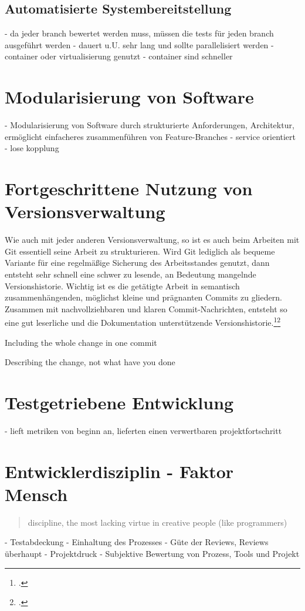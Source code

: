 \subsection{Automatisierte Systembereitstellung}
- da jeder branch bewertet werden muss, müssen die tests für jeden branch ausgeführt werden
- dauert u.U. sehr lang und sollte parallelisiert werden
- container oder virtualisierung genutzt 
- container sind schneller
\section{Modularisierung von Software}
- Modularisierung von Software durch strukturierte Anforderungen, Architektur, ermöglicht einfacheres zusammenführen von Feature-Branches
- service orientiert
- lose kopplung
\section{Fortgeschrittene Nutzung von Versionsverwaltung}
Wie auch mit jeder anderen Versionsverwaltung, so ist es auch beim Arbeiten mit Git essentiell seine Arbeit zu strukturieren. Wird Git lediglich als bequeme Variante für eine regelmäßige Sicherung des Arbeitsstandes genutzt, dann entsteht sehr schnell eine schwer zu lesende, an Bedeutung mangelnde Versionshistorie. Wichtig ist es die getätigte Arbeit in semantisch zusammenhängenden, möglichst kleine und prägnanten Commits zu gliedern.
Zusammen mit nachvollziehbaren und klaren Commit-Nachrichten, entsteht so eine gut leserliche und die Dokumentation unterstützende Versionshistorie.\footcite[Making only one change per commit][]{git-essentials-2017}\footcite[Writing commit messages before starting to code][]{git-essentials-2017}

Including the whole change in one commit

Describing the change, not what have you done
\section{Testgetriebene Entwicklung}
- lieft metriken von beginn an, lieferten einen verwertbaren projektfortschritt


\section{Entwicklerdisziplin - Faktor Mensch}
\label{sec:human-fail}
\blockquote {discipline, the most lacking virtue in creative people (like programmers)}
- Testabdeckung
- Einhaltung des Prozesses
- Güte der Reviews, Reviews überhaupt
- Projektdruck
- Subjektive Bewertung von Prozess, Tools und Projekt

